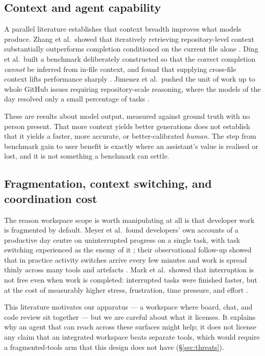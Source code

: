 \documentclass[acmsmall,review,screen]{acmart}
\begin{document}
\subsection{Context and agent capability}

A parallel literature establishes that context breadth improves what models
produce. Zhang et al.\ showed that iteratively retrieving repository-level
context substantially outperforms completion conditioned on the current file
alone \cite{zhang2023repocoder}. Ding et al.\ built a benchmark deliberately
constructed so that the correct completion \emph{cannot} be inferred from
in-file context, and found that supplying cross-file context lifts performance
sharply \cite{ding2023crosscodeeval}. Jimenez et al.\ pushed the unit of work up
to whole GitHub issues requiring repository-scale reasoning, where the models of
the day resolved only a small percentage of tasks \cite{jimenez2024swebench}.

These are results about model output, measured against ground truth with no
person present. That more context yields better generations does not establish
that it yields a faster, more accurate, or better-calibrated \emph{human}. The
step from benchmark gain to user benefit is exactly where an assistant's value
is realised or lost, and it is not something a benchmark can settle.

\subsection{Fragmentation, context switching, and coordination cost}

The reason workspace scope is worth manipulating at all is that developer work
is fragmented by default. Meyer et al.\ found developers' own accounts of a
productive day centre on uninterrupted progress on a single task, with task
switching experienced as the enemy of it \cite{meyer2014perceptions}; their
observational follow-up showed that in practice activity switches arrive every
few minutes and work is spread thinly across many tools and artefacts
\cite{meyer2017worklife}. Mark et al.\ showed that interruption is not free even
when work is completed: interrupted tasks were finished faster, but at the cost
of measurably higher stress, frustration, time pressure, and effort
\cite{mark2008cost}.

This literature motivates our apparatus --- a workspace where board, chat, and
code review sit together --- but we are careful about what it licenses. It
explains why an agent that can reach across these surfaces might help; it does
not license any claim that an integrated workspace beats separate tools, which
would require a fragmented-tools arm that this design does not have
(\S\ref{sec:threats}).
\end{document}

